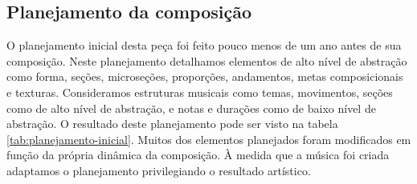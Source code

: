 \subsection{Planejamento da composição}
\label{sec:plan-da-comp}

O planejamento inicial desta peça foi feito pouco menos de um ano
antes de sua composição. Neste planejamento detalhamos elementos de
alto nível de abstração como forma, seções, microseções, proporções,
andamentos, metas composicionais e texturas. Consideramos estruturas
musicais como temas, movimentos, seções como de alto nível de
abstração, e notas e durações como de baixo nível de abstração. O
resultado deste planejamento pode ser visto na tabela
\ref{tab:planejamento-inicial}. Muitos dos elementos planejados foram
modificados em função da própria dinâmica da composição. À medida que
a música foi criada adaptamos o planejamento privilegiando o resultado
artístico.

